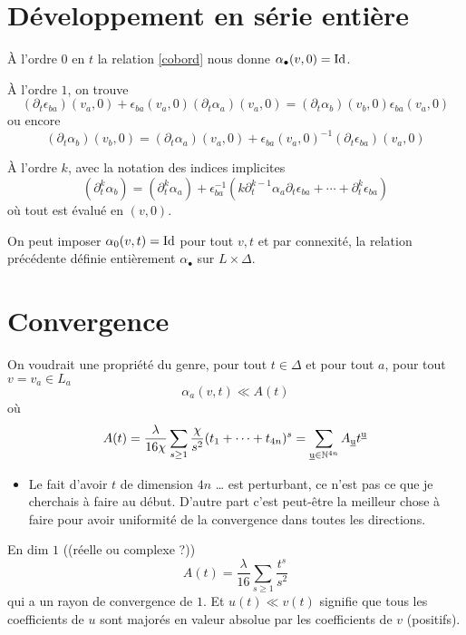 \documentclass[a4paper]{article}
\DeclareMathOperator\uu{\underline{u}}
\begin{document}
\section{Développement en série entière}
\label{sec-3}

À l'ordre $0$ en $t$ la relation \eqref{cobord} nous donne
$\alpha_\bullet(v,0) = \operatorname{Id}$.

À l'ordre $1$, on trouve
\[
(\partial_t\epsilon_{ba})(v_a,0) + \epsilon_{ba}(v_a,0)(\partial_t \alpha_a)(v_a,0)  = (\partial_t \alpha_b)(v_b,0)\epsilon_{ba}(v_a,0)
\]
ou encore
\[
(\partial_t \alpha_b)(v_b,0) = (\partial_t \alpha_a)(v_a,0) + \epsilon_{ba}(v_a,0)^{-1}(\partial_t\epsilon_{ba})(v_a,0)
\]

À l'ordre $k$, avec la notation des indices implicites
\[
(\partial^k_t \alpha_b) = (\partial^k_t \alpha_a) + \epsilon_{ba}^{-1}\left(
k \partial^{k-1}_t \alpha_a\partial_t \epsilon_{ba} + \cdots  + \partial^k_t\epsilon_{ba}\right)
\] 
où tout est évalué en $(v,0)$.

On peut imposer $\alpha_{0}(v,t) = \operatorname{Id}$ pour tout $v,t$ et par connexité, la relation précédente définie entièrement $\alpha_\bullet$ sur $L \times \Delta$.

\section{Convergence}
\label{sec-4}

On voudrait une propriété du genre, pour tout $t \in \Delta$ et pour tout $a$, pour tout $v = v_a \in L_a$
\[
\alpha_a(v,t) \ll A(t)
\]
où
\[
A(t) = \dfrac{\lambda}{16\chi}\sum_{s \geq 1} \dfrac{\chi}{s^2}(t_1 + \cdots + t_{4n})^s = \sum_{\uu \in \N^{4n}} A_{\uu} t^{\uu}
\]


\begin{itemize}
\item Le fait d'avoir $t$ de dimension $4n$ \ldots{} est perturbant, ce n'est pas ce que je cherchais à faire au début. D'autre part c'est peut-être la meilleur chose à faire pour avoir uniformité de la convergence dans toutes les directions.
\end{itemize}

En dim $1$ ((réelle ou complexe ?))
\[
A(t) = \dfrac{\lambda}{16} \sum_{s \geq 1} \dfrac{t^s}{s^2}
\]
qui a un rayon de convergence de $1$.
Et $u(t) \ll v(t)$ signifie que tous les coefficients de $u$ sont majorés en valeur absolue par les coefficients de $v$ (positifs).
\end{document}
